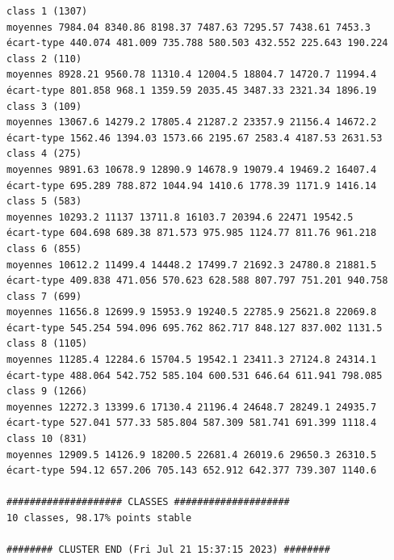 \documentclass[land,article,submit,pdftex,moreauthors]{Definitions/mdpi}
\begin{document}
\begin{scriptsize}
\begin{verbatim}
class 1 (1307)
moyennes 7984.04 8340.86 8198.37 7487.63 7295.57 7438.61 7453.3
écart-type 440.074 481.009 735.788 580.503 432.552 225.643 190.224
class 2 (110)
moyennes 8928.21 9560.78 11310.4 12004.5 18804.7 14720.7 11994.4
écart-type 801.858 968.1 1359.59 2035.45 3487.33 2321.34 1896.19
class 3 (109)
moyennes 13067.6 14279.2 17805.4 21287.2 23357.9 21156.4 14672.2
écart-type 1562.46 1394.03 1573.66 2195.67 2583.4 4187.53 2631.53
class 4 (275)
moyennes 9891.63 10678.9 12890.9 14678.9 19079.4 19469.2 16407.4
écart-type 695.289 788.872 1044.94 1410.6 1778.39 1171.9 1416.14
class 5 (583)
moyennes 10293.2 11137 13711.8 16103.7 20394.6 22471 19542.5
écart-type 604.698 689.38 871.573 975.985 1124.77 811.76 961.218
class 6 (855)
moyennes 10612.2 11499.4 14448.2 17499.7 21692.3 24780.8 21881.5
écart-type 409.838 471.056 570.623 628.588 807.797 751.201 940.758
class 7 (699)
moyennes 11656.8 12699.9 15953.9 19240.5 22785.9 25621.8 22069.8
écart-type 545.254 594.096 695.762 862.717 848.127 837.002 1131.5
class 8 (1105)
moyennes 11285.4 12284.6 15704.5 19542.1 23411.3 27124.8 24314.1
écart-type 488.064 542.752 585.104 600.531 646.64 611.941 798.085
class 9 (1266)
moyennes 12272.3 13399.6 17130.4 21196.4 24648.7 28249.1 24935.7
écart-type 527.041 577.33 585.804 587.309 581.741 691.399 1118.4
class 10 (831)
moyennes 12909.5 14126.9 18200.5 22681.4 26019.6 29650.3 26310.5
écart-type 594.12 657.206 705.143 652.912 642.377 739.307 1140.6

#################### CLASSES ####################
10 classes, 98.17% points stable

######## CLUSTER END (Fri Jul 21 15:37:15 2023) ########
\end{verbatim}
\end{scriptsize}
\end{document}
